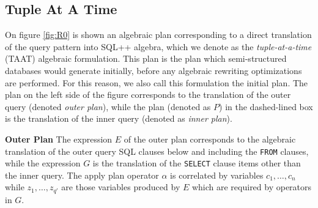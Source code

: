 \subsection{Tuple At A Time}

On figure \ref{fig:R0} is shown an algebraic plan corresponding to a direct translation of the query pattern into SQL++ algebra, which we denote as the \emph{tuple-at-a-time} (TAAT) algebraic formulation. This plan is the plan which semi-structured databases would generate initially, before any algebraic rewriting optimizations are performed. For this reason, we also call this formulation the initial plan. The plan on the left side of the figure corresponds to the translation of the outer query (denoted \emph{outer plan}), while the plan (denoted as $P$) in the dashed-lined box is the translation of the inner query (denoted as \emph{inner plan}). 


\textbf{Outer Plan} The expression $E$ of the outer plan corresponds to the algebraic translation of the outer query SQL clauses below and including the \texttt{FROM} clauses, while the expression $G$ is the translation of the \texttt{SELECT} clause items other than the inner query. The apply plan operator $\alpha$ is correlated by variables $c_1, \dots, c_n$ while $z_1, \dots, z_{q'}$ are those variables produced by $E$ which are required by operators in $G$.


